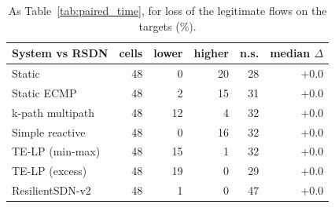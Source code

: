 \begin{table}[t]\centering\scriptsize
\caption{As Table~\ref{tab:paired_time}, for loss of the legitimate flows on the targets (\%).}\label{tab:paired_loss}
\begin{tabular}{lrrrrr}
\toprule
System vs RSDN & cells & lower & higher & n.s. & median $\Delta$\\
\midrule
Static & 48 & 0 & 20 & 28 & +0.0\\
Static ECMP & 48 & 2 & 15 & 31 & +0.0\\
k-path multipath & 48 & 12 & 4 & 32 & +0.0\\
Simple reactive & 48 & 0 & 16 & 32 & +0.0\\
TE-LP (min-max) & 48 & 15 & 1 & 32 & +0.0\\
TE-LP (excess) & 48 & 19 & 0 & 29 & +0.0\\
ResilientSDN-v2 & 48 & 1 & 0 & 47 & +0.0\\
\bottomrule
\end{tabular}
\end{table}